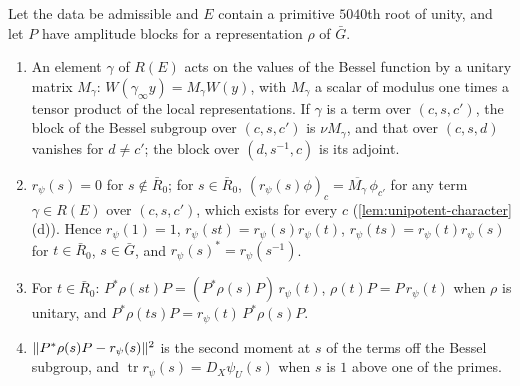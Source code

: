 \begin{lemma}\label{lem:bessel-translate}
Let the data be admissible and $E$ contain a primitive $5040$th root of unity, and let $P$ have amplitude blocks for a representation $\rho$ of $\bar G$.
\begin{enumerate}[label=\textup{(\alph*)}]
\item An element $\gamma$ of $R(E)$ acts on the values of the Bessel function by a unitary matrix $M_\gamma$: $W(\gamma_\infty y)=M_\gamma W(y)$, with $M_\gamma$ a scalar of modulus one times a tensor product of the local representations. If $\gamma$ is a term over $(c,s,c')$, the block of
the Bessel subgroup over $(c,s,c')$ is $\nu M_\gamma$, and that over $(c,s,d)$ vanishes for $d\ne c'$; the block over $(d,s^{-1},c)$ is its adjoint.
\item $r_\psi(s)=0$ for $s\notin\bar R_0$; for $s\in\bar R_0$, $(r_\psi(s)\phi)_c=\overline{M_\gamma}\,\phi_{c'}$ for any term $\gamma\in R(E)$ over $(c,s,c')$, which exists for every $c$ (\cref{lem:unipotent-character}(d)). Hence $r_\psi(1)=1$, $r_\psi(st)=r_\psi(s)r_\psi(t)$, $r_\psi(ts)=r_\psi(t)r_\psi(s)$ for
$t\in\bar R_0$, $s\in\bar G$, and $r_\psi(s)^*=r_\psi(s^{-1})$.
\item For $t\in\bar R_0$: $P^*\rho(st)P=(P^*\rho(s)P)\,r_\psi(t)$, $\rho(t)P=P\,r_\psi(t)$ when $\rho$ is unitary, and $P^*\rho(ts)P=r_\psi(t)\,P^*\rho(s)P$.
\item $\lVert P^*\rho(s)P-r_\psi(s)\rVert^2$ is the second moment at $s$ of the terms off the Bessel subgroup, and $\operatorname{tr}r_\psi(s)=D_X\psi_U(s)$ when $s$ is $1$ above one of the primes.
\end{enumerate}
\end{lemma}

